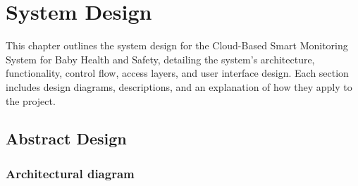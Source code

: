 \documentclass[12pt,a4paper]{report}
\begin{document}


\chapter{System Design}
This chapter outlines the system design for the Cloud-Based Smart Monitoring System for Baby Health and Safety, detailing the system's architecture, functionality, control flow, access layers, and user interface design. Each section includes design diagrams, descriptions, and an explanation of how they apply to the project.
\section{Abstract Design}

\subsection{Architectural diagram}
\end{document}
